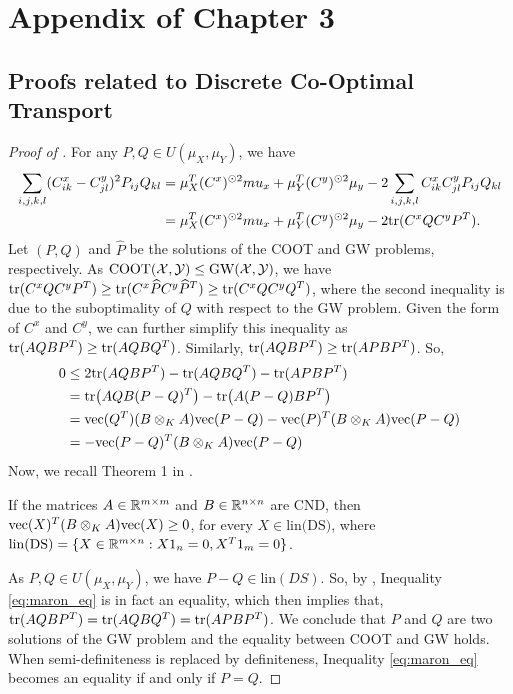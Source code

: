 \section{Appendix of Chapter 3}

\subsection{Proofs related to Discrete Co-Optimal Transport}

\begin{proof}[Proof of ]
  For any $P, Q \in U(\mu_X, \mu_Y)$, we have
  \begin{align}
    \sum_{i,j,k,l} (C^x_{ik} - C^y_{jl})^2 P_{ij} Q_{kl} &=
    \mu_X^T (C^x)^{\odot 2} mu_x + \mu_Y^T (C^y)^{\odot 2}\mu_y
      - 2 \sum_{i,j,k,l} C^x_{ik} C^y_{jl} P_{ij} Q_{kl} \\
    &= \mu_X^T (C^x)^{\odot 2} mu_x + \mu_Y^T (C^y)^{\odot 2}\mu_y - 2 \text{tr}(C^x Q C^y P^T).
  \end{align}
  Let $(P, Q)$ and $\widehat{P}$ be the solutions of the COOT and GW problems, respectively.
  As $\text{COOT}(\mathcal X, \mathcal Y) \leq \text{GW}(\mathcal X, \mathcal Y)$, we have
  $\text{tr}(C^x Q C^y P^T) \geq \text{tr}(C^x \widehat{P} C^y \widehat{P}^T) \geq \text{tr}(C^x Q C^y Q^T)$,
  where the second inequality is due to the suboptimality of $Q$ with respect to the GW problem.
  Given the form of $C^x$ and $C^y$, we can further simplify this inequality as
  $\text{tr}(A Q B P^T) \geq \text{tr}(A Q B Q^T)$. Similarly, $\text{tr}(A Q B P^T) \geq \text{tr}(A P B P^T)$. So,
  \begin{align} \label{eq:maron_eq}
    0 &\leq 2 \text{tr}(AQBP^T) - \text{tr}(AQBQ^T) - \text{tr}(APBP^T) \\
    &= \text{tr} \big( AQB (P-Q)^T \big) - \text{tr}\big( A(P-Q) B P^T \big) \\
    &= \text{vec}(Q^T) (B \otimes_K A) \text{vec}(P-Q) - \text{vec}(P)^T (B \otimes_K A) \text{vec}(P-Q) \\
    &= - \text{vec}(P-Q)^T (B \otimes_K A) \text{vec}(P-Q)
  \end{align}
  Now, we recall Theorem 1 in \citep{Maron18}.
  \begin{lemma} \label{lemma:maron}
    If the matrices $A \in \mathbb R^{m \times m}$ and $B \in \mathbb R^{n \times n}$
    are CND, then $\text{vec}(X)^T (B \otimes_K A) \text{vec}(X) \geq 0$, for every $X \in \text{lin(DS)}$,
    where $\text{lin(DS)} = \{X \in \mathbb R^{m \times n}: X 1_n = 0, X^T 1_m = 0 \}$.
  \end{lemma}
  As $P, Q \in U(\mu_X, \mu_Y)$, we have $P-Q \in \text{lin}(DS)$. So, by ,
  Inequality \eqref{eq:maron_eq} is in fact an equality, which then implies that,
  $\text{tr}(A Q B P^T) = \text{tr}(A Q B Q^T) = \text{tr}(A P B P^T)$.
  We conclude that $P$ and $Q$ are two solutions of the GW problem and
  the equality between COOT and GW holds. When semi-definiteness is replaced by definiteness,
  Inequality \eqref{eq:maron_eq} becomes an equality if and only if $P=Q$.
\end{proof}

